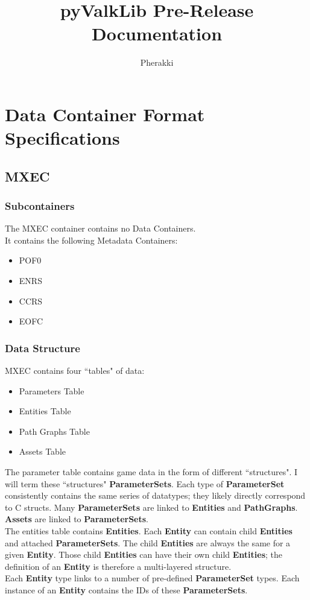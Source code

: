 \documentclass{article}
\title{pyValkLib Pre-Release Documentation}
\author{Pherakki}
\begin{document}
\maketitle
\tableofcontents
\newpage

\section{Data Container Format Specifications}
\subsection{MXEC}
\subsubsection{Subcontainers}
The MXEC container contains no Data Containers.\\
It contains the following Metadata Containers:
\begin{itemize}
\item POF0
\item ENRS
\item CCRS
\item EOFC
\end{itemize}
\subsubsection{Data Structure}
MXEC contains four ``tables" of data:
\begin{itemize}
\item Parameters Table
\item Entities Table
\item Path Graphs Table
\item Assets Table
\end{itemize}
The parameter table contains game data in the form of different ``structures". I will term these ``structures" \textbf{ParameterSets}. Each type of \textbf{ParameterSet} consistently contains the same series of datatypes; they likely directly correspond to C structs. Many \textbf{ParameterSets} are linked to \textbf{Entities} and \textbf{PathGraphs}. \textbf{Assets} are linked to \textbf{ParameterSets}.\\

The entities table contains \textbf{Entities}. Each \textbf{Entity} can contain child \textbf{Entities} and attached \textbf{ParameterSets}. The child \textbf{Entities} are always the same for a given \textbf{Entity}. Those child \textbf{Entities} can have their own child \textbf{Entities}; the definition of an \textbf{Entity} is therefore a multi-layered structure.\\
Each \textbf{Entity} type links to a number of pre-defined \textbf{ParameterSet} types. Each instance of an \textbf{Entity} contains the IDs of these \textbf{ParameterSets}.\\
\end{document}
